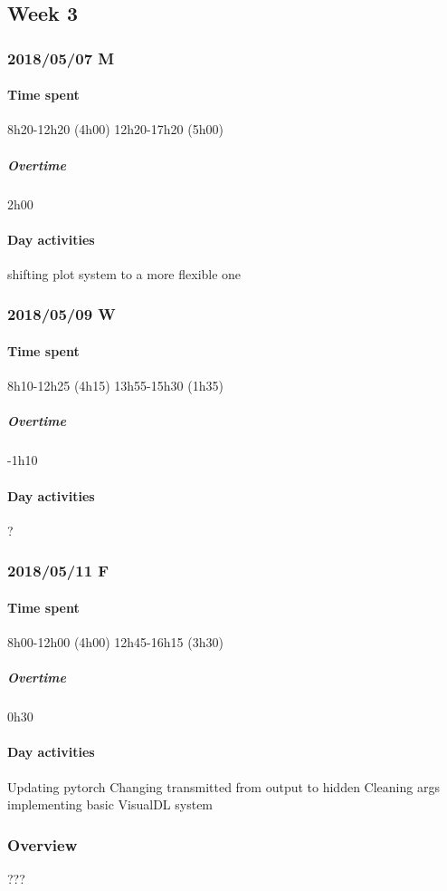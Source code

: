 \subsection{Week 3}
\subsubsection{2018/05/07 M}
\paragraph{Time spent}
{8h20}-{12h20} (4h00)
{12h20}-{17h20} (5h00)

\subparagraph{Overtime}
2h00

\paragraph{Day activities}
shifting plot system to a more flexible one

\subsubsection{2018/05/09 W}
\paragraph{Time spent}
{8h10}-{12h25} (4h15)
{13h55}-{15h30} (1h35) 

\subparagraph{Overtime}
-1h10

\paragraph{Day activities}
?

\subsubsection{2018/05/11 F}
\paragraph{Time spent}
{8h00}-{12h00} (4h00)
{12h45}-{16h15} (3h30) 

\subparagraph{Overtime}
0h30

\paragraph{Day activities}
Updating pytorch
Changing transmitted from output to hidden
Cleaning args
implementing basic VisualDL system

\subsubsection{Overview}
???